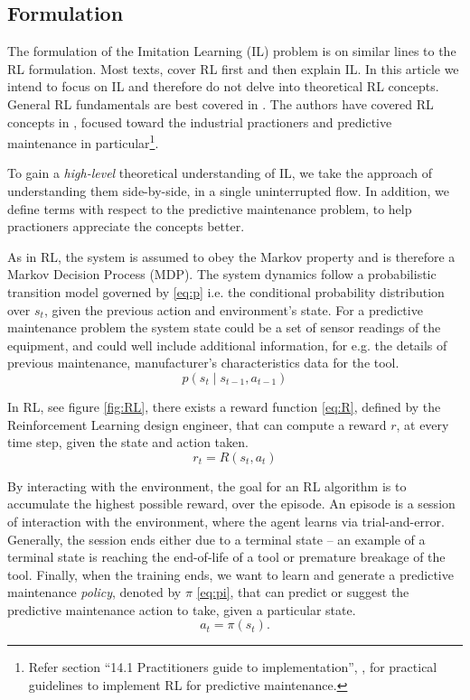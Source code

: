 \documentclass{article}
\begin{document}
	
	\subsection{Formulation} %
	
	The formulation of the Imitation Learning (IL) problem is on similar lines to the RL formulation. Most texts, cover RL first and then explain IL. In this article we intend to focus on IL and therefore do not delve into theoretical RL concepts. General RL fundamentals are best covered in \citep{sutton2018, stanford-lectures}. The authors have covered RL concepts in \cite{siraskar2023}, focused toward the industrial practioners and predictive maintenance in particular\footnote{Refer section ``14.1 Practitioners guide to implementation'', \citep{siraskar2023}, for practical guidelines to implement RL for predictive maintenance.}.  
	
	To gain a \textit{high-level} theoretical understanding of IL, we take the approach of understanding them side-by-side, in a single uninterrupted flow. In addition, we define terms with respect to the predictive maintenance problem, to help practioners appreciate the concepts better. 
	
	As in RL, the system is assumed to obey the Markov property and is therefore a Markov Decision Process (MDP). The system dynamics follow a probabilistic transition model governed by \eqref{eq:p} i.e. the conditional probability distribution over $s_t$, given the previous action and environment's state. For a predictive maintenance problem the system state could be a set of sensor readings of the equipment, and could well include additional information, for e.g. the details of previous maintenance, manufacturer's characteristics data for the tool.
	\begin{equation}\label{eq:p}
		p(s_t \mid s_{t-1}, a_{t-1})
	\end{equation}
	
	In RL, see figure \ref{fig:RL}, there exists a reward function \eqref{eq:R}, defined by the Reinforcement Learning design engineer, that can compute a reward $r$, at every time step, given the state and action taken.
	\begin{equation}\label{eq:R}
		r_t = R(s_t, a_t)
	\end{equation}
	
	By interacting with the environment, the goal for an RL algorithm is to accumulate the highest possible reward, over the episode. An episode is a session of interaction with the environment, where the agent learns via trial-and-error. Generally, the session ends either due to a terminal state -- an example of a terminal state is reaching the end-of-life of a tool or premature breakage of the tool. Finally, when the training ends, we want to learn and generate a predictive maintenance \textit{policy}, denoted by $\pi$ \eqref{eq:pi}, that can predict or suggest the predictive maintenance action to take, given a particular state.
	\begin{equation}\label{eq:pi}
		a_t = \pi(s_t).
	\end{equation}
	
\end{document}
